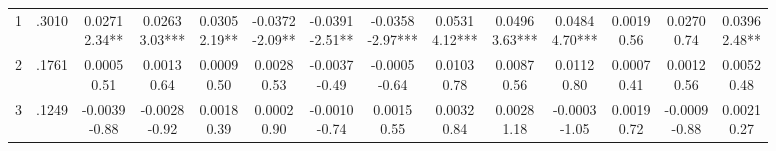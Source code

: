 \begin{landscape}
\begin{center}
{\begin{adjustbox}{max width=\textheight}
\begin{tabular}{lccccccccccccc}
1 & .3010 & \shortstack{0.0271\\2.34**} & \shortstack{0.0263\\3.03***} & \shortstack{0.0305\\2.19**} & \shortstack{-0.0372\\-2.09**} & \shortstack{-0.0391\\-2.51**} & \shortstack{-0.0358\\-2.97***} & \shortstack{0.0531\\4.12***} & \shortstack{0.0496\\3.63***} & \shortstack{0.0484\\4.70***} & \shortstack{0.0019\\0.56} & \shortstack{0.0270\\0.74} & \shortstack{0.0396\\2.48**} \\
2 & .1761 & \shortstack{0.0005\\0.51} & \shortstack{0.0013\\0.64} & \shortstack{0.0009\\0.50} & \shortstack{0.0028\\0.53} & \shortstack{-0.0037\\-0.49} & \shortstack{-0.0005\\-0.64} & \shortstack{0.0103\\0.78} & \shortstack{0.0087\\0.56} & \shortstack{0.0112\\0.80} & \shortstack{0.0007\\0.41} & \shortstack{0.0012\\0.56} & \shortstack{0.0052\\0.48} \\
3 & .1249 & \shortstack{-0.0039\\-0.88} & \shortstack{-0.0028\\-0.92} & \shortstack{0.0018\\0.39} & \shortstack{0.0002\\0.90} & \shortstack{-0.0010\\-0.74} & \shortstack{0.0015\\0.55} & \shortstack{0.0032\\0.84} & \shortstack{0.0028\\1.18} & \shortstack{-0.0003\\-1.05} & \shortstack{0.0019\\0.72} & \shortstack{-0.0009\\-0.88} & \shortstack{0.0021\\0.27} \\

\end{tabular}
\end{adjustbox}}
\end{center}
\end{landscape}
